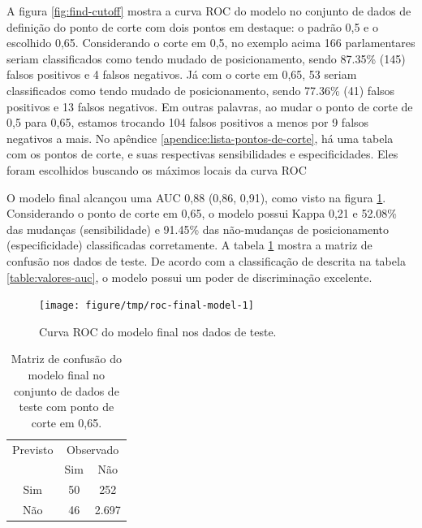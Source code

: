 \documentclass[a4paper,titlepage]{ppgi}\usepackage[]{graphicx}\usepackage[]{color}
\newenvironment{knitrout}{}{} %
\begin{document}
A figura \ref{fig:find-cutoff} mostra a curva \gls{ROC} do modelo no conjunto de
dados de definição do ponto de corte com dois pontos em destaque: o padrão 0,5
e o escolhido 0,65. Considerando o corte em 0,5, no exemplo
acima 166 parlamentares seriam classificados como
tendo mudado de posicionamento, sendo 87.35\% (145) falsos positivos e
4 falsos negativos. Já com o corte em 0,65,
53 seriam classificados como tendo mudado de
posicionamento, sendo 77.36\% (41) falsos positivos e 13
falsos negativos.  Em outras palavras, ao mudar o ponto de corte de 0,5 para
0,65, estamos trocando 104 falsos
positivos a menos por 9 falsos negativos a mais.
No apêndice \ref{apendice:lista-pontos-de-corte}, há uma tabela com os pontos
de corte, e suas respectivas sensibilidades e especificidades. Eles foram
escolhidos buscando os máximos locais da curva \gls{ROC}



O modelo final alcançou uma \gls{AUC} 0,88
(0,86, 0,91),
como visto na figura \ref{fig:roc-final-model}. Considerando o ponto de corte
em 0,65, o modelo possui Kappa
0,21 e
52.08\% das mudanças
(sensibilidade) e 91.45\%
das não-mudanças de posicionamento (especificidade) classificadas corretamente.
A tabela \ref{table:confusion-matrix-final-model} mostra a matriz de confusão
nos dados de teste. De acordo com a classificação de 
descrita na tabela \ref{table:valores-auc}, o modelo possui um poder de
discriminação excelente.

\begin{knitrout}
\color{fgcolor}\begin{figure}
\texttt{[image: figure/tmp/roc-final-model-1]} \caption[Curva ROC do modelo final nos dados de teste]{Curva ROC do modelo final nos dados de teste.}\label{fig:roc-final-model}
\end{figure}


\end{knitrout}

\begin{table}
\centering
\begin{tabular}{c c c}
  Previsto & \multicolumn{2}{c}{Observado} \\  \cline{2-3}
  & \multicolumn{1}{|c}{Sim} & \multicolumn{1}{c|}{Não} \\
  \hline
  \multicolumn{1}{|c|}{Sim} & 50 & \multicolumn{1}{c|}{252} \\
  \multicolumn{1}{|c|}{Não} & 46 & \multicolumn{1}{c|}{2.697} \\
  \hline
\end{tabular}
\caption{Matriz de confusão do modelo final no conjunto de dados de teste com ponto de corte em 0,65.}
\label{table:confusion-matrix-final-model}
\end{table}
\end{document}
